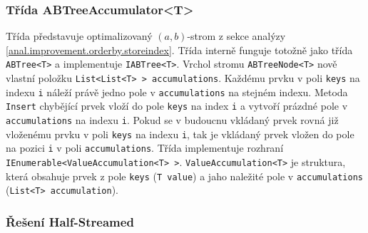 \subsubsection{Třída ABTreeAccumulator<T>}

Třída představuje optimalizovaný $(a, b)$-strom z sekce analýzy \ref{anal.improvement.orderby.storeindex}.
Třída interně funguje totožně jako třída \texttt{ABTree<T>} a implementuje \texttt{IABTree<T>}.
Vrchol stromu \texttt{ABTreeNode<T>} nově vlastní položku \texttt{List<List<T> > accumulations}.
Každému prvku v poli \texttt{keys} na indexu \texttt{i} náleží právě jedno pole v \texttt{accumulations} na stejném indexu.
Metoda \texttt{Insert} chybějící prvek vloží do pole \texttt{keys} na index \texttt{i} a vytvoří prázdné pole v \texttt{accumulations} na indexu \texttt{i}.
Pokud se v budoucnu vkládaný prvek rovná již vloženému prvku v poli \texttt{keys} na indexu \texttt{i}, tak je vkládaný prvek vložen do pole na pozici \texttt{i} v poli \texttt{accumulations}.
Třída implementuje rozhraní \texttt{IEnumerable<ValueAccumulation<T> >}.
\texttt{ValueAccumulation<T>} je struktura, která obsahuje prvek z pole \texttt{keys} (\texttt{T value}) a jaho naležité pole v \texttt{accumulations} (\texttt{List<T> accumulation}).

\subsubsection{Řešení Half-Streamed}


